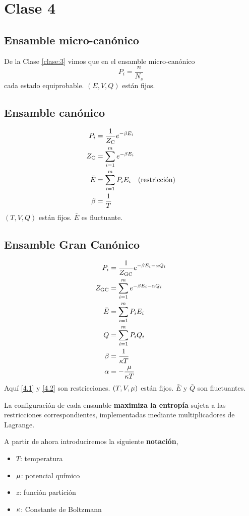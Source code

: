 \section{Clase 4}
\subsection{Ensamble micro-canónico}
De la Clase \ref{clase:3} vimos que en el ensamble micro-canónico
\begin{equation}
  P_i=\frac{n}{N_s}
\end{equation}
cada estado equiprobable. $(E,V,Q)$ están fijos.

\subsection{Ensamble canónico}
\begin{align}
  P_i&=\frac{1}{Z_{\rm C}}e^{-\beta E_i}\\ Z_{\rm C}&=\sum_{i=1}^m e^{-\beta E_i}\\ \bar{E}&=\sum_{i=1}^m P_iE_i \quad \text{(restricción)}\\
  \beta&=\frac{1}{T}
\end{align}
$(T,V,Q)$ están fijos. $\bar{E}$ es fluctuante.

\subsection{Ensamble Gran Canónico}
\begin{align}
  P_i&=\frac{1}{Z_{\rm GC}}e^{-\beta E_i-\alpha Q_i}\\
  Z_{\rm GC}&=\sum_{i=1}^m e^{-\beta E_i-\alpha Q_i}\\
  \bar{E}&=\sum_{i=1}^m P_iE_i\label{4.1}\\
  \bar{Q}&=\sum_{i=1}^m P_iQ_i\label{4.2}\\
  \beta&=\frac{1}{\kappa T}\\
  \alpha&=-\frac{\mu}{\kappa T}
\end{align}
Aquí \eqref{4.1} y \eqref{4.2} son restricciones. $(T,V,\mu)$ están fijos. $\bar{E}$ y $\bar{Q}$ son fluctuantes.

La configuración de cada ensamble \textbf{maximiza la entropía} sujeta a las restricciones correspondientes, implementadas mediante multiplicadores de Lagrange.

\begin{tcolorbox}
	A partir de ahora introduciremos la siguiente \textbf{notación}, 
	\begin{itemize}
		\item $T$: temperatura
		\item $\mu$: potencial químico
		\item $z$: función partición
		\item $\kappa$: Constante de Boltzmann
	\end{itemize}	
\end{tcolorbox}

